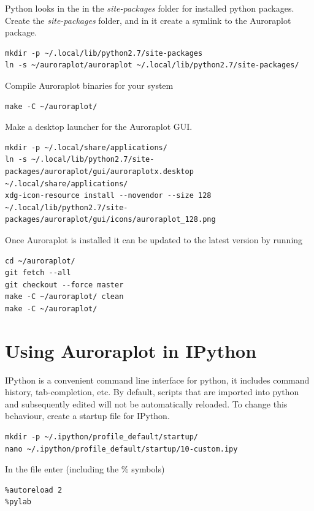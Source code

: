 \documentclass{article}
\begin{document}
Python looks in the in the {\it site-packages} folder for installed python packages. Create the {\it site-packages} folder, and in it create a symlink to the Auroraplot package.

\begin{lstlisting}
mkdir -p ~/.local/lib/python2.7/site-packages
ln -s ~/auroraplot/auroraplot ~/.local/lib/python2.7/site-packages/
\end{lstlisting}

Compile Auroraplot binaries for your system

\begin{lstlisting}
make -C ~/auroraplot/
\end{lstlisting}

Make a desktop launcher for the Auroraplot GUI.
\begin{lstlisting}
mkdir -p ~/.local/share/applications/
ln -s ~/.local/lib/python2.7/site-packages/auroraplot/gui/auroraplotx.desktop ~/.local/share/applications/
xdg-icon-resource install --novendor --size 128 ~/.local/lib/python2.7/site-packages/auroraplot/gui/icons/auroraplot_128.png
\end{lstlisting}

Once Auroraplot is installed it can be updated to the latest version by running
\begin{lstlisting}
cd ~/auroraplot/
git fetch --all
git checkout --force master
make -C ~/auroraplot/ clean
make -C ~/auroraplot/
\end{lstlisting}


\section{Using Auroraplot in IPython}

IPython is a convenient command line interface for python, it includes command history, tab-completion, etc.
By default, scripts that are imported into python and subsequently edited will not be automatically reloaded. To change this behaviour, create a startup file for IPython.

\begin{lstlisting}
mkdir -p ~/.ipython/profile_default/startup/
nano ~/.ipython/profile_default/startup/10-custom.ipy
\end{lstlisting}

In the file enter (including the \% symbols)
\begin{lstlisting}[style=pythonstyle]
%load_ext autoreload
%autoreload 2
%pylab
\end{lstlisting}
\end{document}
